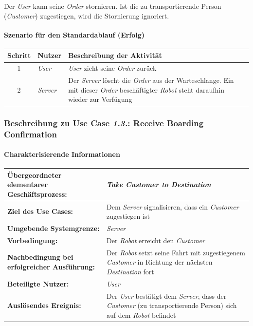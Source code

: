 			Der \emph{User} kann seine \emph{Order} stornieren. Ist die zu transportierende Person (\emph{Customer}) zugestiegen, wird die Stornierung ignoriert.
			
			\paragraph*{Szenario für den Standardablauf (Erfolg)}
			
			\begin{table}[H]
				\centering
				\begin{tabularx}{\textwidth}{|c|p{2cm}|X|}
					\hline
					Schritt & Nutzer & Beschreibung der Aktivität \\ \hline
					1 & \emph{User} & \emph{User} zieht seine \emph{Order} zurück \\
					2 & \emph{Server} & Der \emph{Server} löscht die \emph{Order} aus der Warteschlange. Ein mit dieser \emph{Order} beschäftigter \emph{Robot} steht daraufhin wieder zur Verfügung \\
					\hline
				\end{tabularx}
			\end{table}
		
			
			\pagebreak
	
			\subsubsection{Beschreibung zu Use Case \emph{1.3.}: Receive Boarding Confirmation}
				\paragraph*{Charakterisierende Informationen}
				
				\begin{table}[H]
					\centering
					\begin{tabularx}{\textwidth}{|p{5cm}|X|}
						\hline
						\textbf{Übergeordneter elementarer Geschäftsprozess:} & \emph{Take Customer to Destination} \\ \hline
						\textbf{Ziel des Use Cases:} & Dem \emph{Server} signalisieren, dass ein \emph{Customer} zugestiegen ist \\ \hline
						\textbf{Umgebende Systemgrenze:} & \emph{Server} \\ \hline
						\textbf{Vorbedingung:} & Der \emph{Robot} erreicht den \emph {Customer} \\ \hline
						\textbf{Nachbedingung bei erfolgreicher Ausführung:} & Der \emph{Robot} setzt seine Fahrt mit zugestiegenem \emph{Customer} in Richtung der nächsten \emph{Destination} fort \\ \hline
						\textbf{Beteiligte Nutzer:} & \emph{User} \\ \hline
						\textbf{Auslösendes Ereignis:} & Der \emph{User} bestätigt dem \emph{Server}, dass der \emph{Customer} (zu transportierende Person) sich auf dem \emph{Robot} befindet \\
						\hline
					\end{tabularx}
				\end{table}
				

